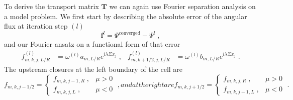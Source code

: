 To derive the transport matrix $\bm{T}$ we can again use Fourier separation analysis on a model problem.
We first start by describing the absolute error of the angular flux at iteration step $(l)$
\begin{equation}
    \mathbf{f}^l = \Psi^{\text{converged}} - \Psi^l \;,
\end{equation}
and our Fourier ansatz on a functional form of that error
\begin{subequations}
    \label{eq:anz}
    \begin{align}
        f^{(l)}_{m,k,j,L/R} &= \omega^{(l)}a_{m,L/R}e^{i\lambda\Sigma x_j} \; ,
        &
        f^{(l)}_{m,k+1/2,j,L/R} &= \omega^{(l)}b_{m,L/R}e^{i\lambda\Sigma x_j} \;.
    \end{align}
\end{subequations} 
The upstream closures at the left boundary of the cell are
\begin{subequations}
\begin{equation}
    f_{m,k,j-1/2} =
    \begin{cases}
        f_{m,k,j-1, R} \;, & \mu > 0 \\
        f_{m,k,j, L} \;, & \mu < 0 
    \end{cases} \;,
\end{equation}
and at the right are
\begin{equation}
    f_{m,k,j+1/2} =
    \begin{cases}
        f_{m,k,j, R} \;, & \mu > 0 \\
        f_{m,k,j+1, L} \;, & \mu < 0 
    \end{cases} \;.
\end{equation}
\end{subequations}

